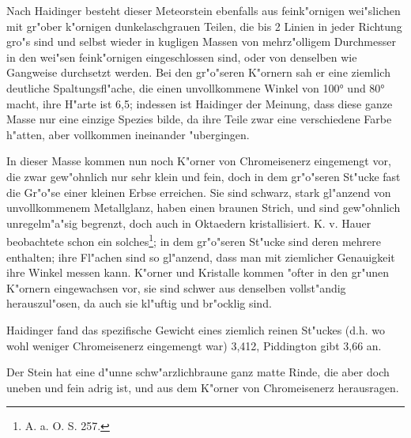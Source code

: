 \documentclass[a4paper, 11pt, oneside, german]{article}
\begin{document}
Nach Haidinger besteht dieser Meteorstein ebenfalls aus feink"ornigen wei"slichen mit gr"ober k"ornigen dunkelaschgrauen Teilen, die bis 2 Linien in jeder Richtung gro"s sind und selbst wieder in kugligen Massen von mehrz"olligem Durchmesser in den wei"sen feink"ornigen eingeschlossen sind, oder von denselben wie Gangweise durchsetzt werden. Bei den gr"o"seren K"ornern sah er eine ziemlich deutliche Spaltungsfl"ache, die einen unvollkommene Winkel von 100° und 80° macht, ihre H"arte ist 6,5; indessen ist Haidinger der Meinung, dass diese ganze Masse nur eine einzige Spezies bilde, da ihre Teile zwar eine verschiedene Farbe h"atten, aber vollkommen ineinander "ubergingen.

In dieser Masse kommen nun noch K"orner von Chromeisenerz eingemengt vor, die zwar gew"ohnlich nur sehr klein und fein, doch in dem gr"o"seren St"ucke fast die Gr"o"se einer kleinen Erbse erreichen. Sie sind schwarz, stark gl"anzend von unvollkommenem Metallglanz, haben einen braunen Strich, und sind gew"ohnlich unregelm"a"sig begrenzt, doch auch in Oktaedern kristallisiert. K. v. Hauer beobachtete schon ein solches\footnote{A. a. O. S. 257.}; in dem gr"o"seren St"ucke sind deren mehrere enthalten; ihre Fl"achen sind so gl"anzend, dass man mit ziemlicher Genauigkeit ihre Winkel messen kann. K"orner und Kristalle kommen "ofter in den gr"unen K"ornern eingewachsen vor, sie sind schwer aus denselben vollst"andig herauszul"osen, da auch sie kl"uftig und br"ocklig sind.

Haidinger fand das spezifische Gewicht eines ziemlich reinen St"uckes (d.h. wo wohl weniger Chromeisenerz eingemengt war) 3,412, Piddington gibt 3,66 an.

Der Stein hat eine d"unne schw"arzlichbraune ganz matte Rinde, die aber doch uneben und fein adrig ist, und aus dem K"orner von Chromeisenerz herausragen.
\end{document}
